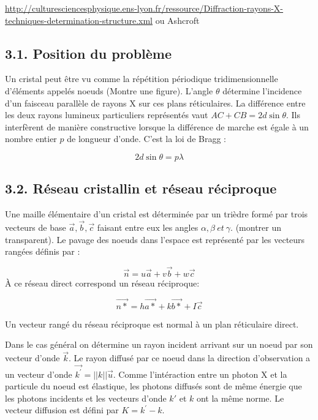 \documentclass[french, a4paper, 10pt, twocolumn, landscape]{article}
\begin{document}
\url{http://culturesciencesphysique.ens-lyon.fr/ressource/Diffraction-rayons-X-techniques-determination-structure.xml} ou Ashcroft

\subsection*{3.1. Position du problème}

Un cristal peut être vu comme la répétition périodique tridimensionnelle d'éléments appelés noeuds (Montre une figure). L'angle $\theta$ détermine l'incidence d'un faisceau parallèle de rayons X sur ces plans réticulaires. La différence entre les deux rayons lumineux particuliers représentés vaut $AC+CB = 2d\sin\theta$. Ils interfèrent de manière constructive lorsque la différence de marche est égale à un nombre entier $p$ de longueur d'onde. C'est la loi de Bragg : 

\begin{equation}
    2d\sin\theta = p\lambda
\end{equation}

\subsection*{3.2. Réseau cristallin et réseau réciproque}

Une maille élémentaire d'un cristal est déterminée par un trièdre formé par trois vecteurs de base $\vec{a},\vec{b},\vec{c}$ faisant entre eux les angles $\alpha,\beta~ et~ \gamma$. (montrer un transparent). Le pavage des noeuds dans l'espace est représenté par les vecteurs rangées définis par : 

\begin{equation}
    \vec{n} = u\vec{a}+v\vec{b}+w\vec{c}
\end{equation}
À ce réseau direct correspond un réseau réciproque:

\begin{equation}
    \vec{n*} = h\vec{a*}+k\vec{b*}+I\vec{c}
\end{equation}

Un vecteur rangé du réseau réciproque est normal à un plan réticulaire direct.\medskip

Dans le cas général on détermine un rayon incident arrivant sur un noeud par son vecteur d'onde $\vec{k}$. Le rayon diffusé par ce noeud dans la direction d'observation a un vecteur d'onde $\vec{k^\prime} = ||k||\vec{u}$. Comme l'intéraction entre un photon X et la particule du noeud est élastique, les photons diffusés sont de même énergie que les photons incidents et les vecteurs d'onde $k\prime$ et $k$ ont la même norme. Le vecteur diffusion est défini par $K = k^\prime - k$.
\end{document}
